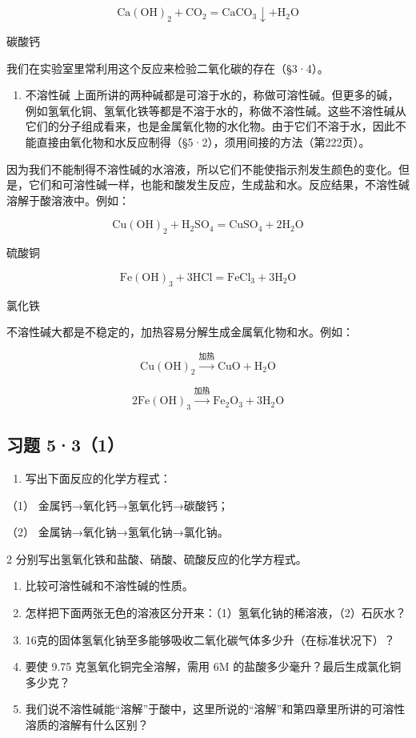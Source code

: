 \[
\mathrm{Ca} (\mathrm{OH}) _ {2} + \mathrm{CO}_{2} = \mathrm{CaCO}_{3} \downarrow + \mathrm{H}_{2} \mathrm{O}
\]

碳酸钙

我们在实验室里常利用这个反应来检验二氧化碳的存在（§3·4）。

\begin{enumerate}[start=3]
\item
  不溶性碱
  上面所讲的两种碱都是可溶于水的，称做可溶性碱。但更多的碱，例如氢氧化铜、氢氧化铁等都是不溶于水的，称做不溶性碱。这些不溶性碱从它们的分子组成看来，也是金属氧化物的水化物。由于它们不溶于水，因此不能直接由氧化物和水反应制得（§5·2），须用间接的方法（第222页）。
\end{enumerate}

因为我们不能制得不溶性碱的水溶液，所以它们不能使指示剂发生颜色的变化。但是，它们和可溶性碱一样，也能和酸发生反应，生成盐和水。反应结果，不溶性碱溶解于酸溶液中。例如：

\[
\mathrm{Cu} (\mathrm{OH}) _ {2} + \mathrm{H}_{2} \mathrm{SO}_{4} = \mathrm{CuSO}_{4} + 2 \mathrm{H}_{2} \mathrm{O}
\]

硫酸铜

\[
\mathrm{Fe} (\mathrm{OH}) _ {3} + 3 \mathrm{HCl} = \mathrm{FeCl}_{3} + 3 \mathrm{H}_{2} \mathrm{O}
\]

氯化铁

不溶性碱大都是不稳定的，加热容易分解生成金属氧化物和水。例如：

\[
\mathrm{Cu(OH)}_{2} \xrightarrow {\text{加热}} \mathrm{CuO} + \mathrm{H}_{2} \mathrm{O}
\]

\[
2\mathrm{Fe(OH)}_{3}\xrightarrow{\text{加热}}\mathrm{Fe}_{2}\mathrm{O}_{3}+3\mathrm{H}_{2}\mathrm{O}
\]

\subsection{习题 5·3（1）}

\begin{enumerate}
\item
  写出下面反应的化学方程式：
\end{enumerate}

（1） 金属钙→氧化钙→氢氧化钙→碳酸钙；

（2） 金属钠→氧化钠→氢氧化钠→氯化钠。

2 分别写出氢氧化铁和盐酸、硝酸、硫酸反应的化学方程式。

\begin{enumerate}[start=3]
\item
  比较可溶性碱和不溶性碱的性质。
\item
  怎样把下面两张无色的溶液区分开来：（1）氢氧化钠的稀溶液，（2）石灰水？
\item
  16克的固体氢氧化钠至多能够吸收二氧化碳气体多少升（在标准状况下）？
\item
  要使 9.75 克氢氧化铜完全溶解，需用 6M
  的盐酸多少毫升？最后生成氯化铜多少克？
\item
  我们说不溶性碱能``溶解''于酸中，这里所说的``溶解''和第四章里所讲的可溶性溶质的溶解有什么区别？
\end{enumerate}

